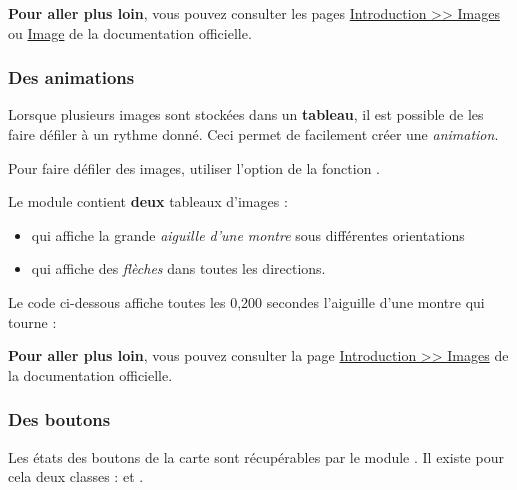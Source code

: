 \begin{remarque}
\textbf{Pour aller plus loin}, vous pouvez consulter les pages  \href{https://microbit-micropython.readthedocs.io/fr/latest/tutorials/images.html}{Introduction >> Images} ou \href{https://microbit-micropython.readthedocs.io/fr/latest/image.html}{Image} de la documentation officielle.
\end{remarque}


\subsubsection{Des animations}

Lorsque plusieurs images sont stockées dans un \textbf{tableau}, il est possible de les faire défiler à un rythme donné. Ceci permet de facilement créer une \emph{animation}. 

Pour faire défiler des images, utiliser l'option 
de la fonction .

Le module  contient \textbf{deux} tableaux d'images :
\begin{itemize}
    \item {} qui affiche la grande \emph{aiguille d'une montre} sous différentes orientations
    \item {} qui affiche des \emph{flèches} dans toutes les directions. 
\end{itemize}

\begin{methode}
Le code ci-dessous affiche toutes les 0,200 secondes l'aiguille d'une montre qui tourne :\par
{}
\end{methode}

\begin{remarque}
\textbf{Pour aller plus loin}, vous pouvez consulter la page  \href{https://microbit-micropython.readthedocs.io/fr/latest/tutorials/images.html}{Introduction >> Images} de la documentation officielle.
\end{remarque}


\subsubsection{Des boutons}

Les états des boutons de la carte \mb sont récupérables par le module . Il existe pour cela deux classes :  et .


